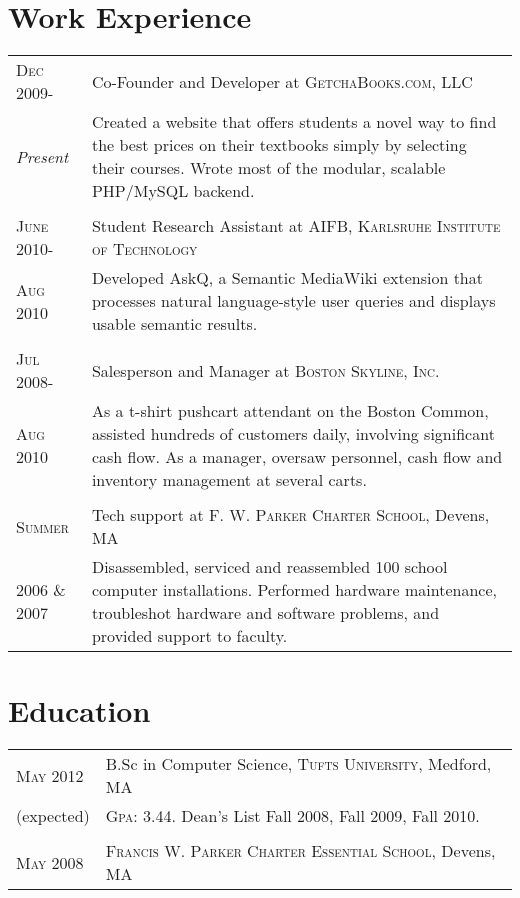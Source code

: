 \documentclass[letterpaper,10pt]{article}
\begin{document}
\section{Work Experience}
\begin{tabular}{p{5em}p{12cm}}
 \textsc{Dec 2009-} & Co-Founder and Developer at \textsc{GetchaBooks.com, LLC} \\\emph{Present}&\small{Created a website that offers students a novel way to find the best prices on their textbooks simply by selecting their courses.  Wrote most of the modular, scalable PHP/MySQL backend.} \\\multicolumn{2}{c}{} \\
\textsc{June 2010-} & Student Research Assistant at \textsc{AIFB, Karlsruhe Institute of Technology} \\ \textsc{Aug 2010} &\small{Developed AskQ, a Semantic MediaWiki extension that processes natural language-style user queries and displays usable semantic results.} \\\multicolumn{2}{c}{} \\
 \textsc{Jul 2008-} & Salesperson and Manager at \textsc{Boston Skyline, Inc.} \\\textsc{Aug 2010}&\small{As a t-shirt pushcart attendant on the Boston Common, assisted hundreds of customers daily, involving significant cash flow.  As a manager, oversaw personnel, cash flow and inventory management at several carts.}\\\multicolumn{2}{c}{} \\
\textsc{Summer} & Tech support at \textsc{F. W. Parker Charter School}, Devens, MA \\\textsc{2006 \& 2007}&\small{Disassembled, serviced and reassembled 100 school computer installations.  Performed hardware maintenance, troubleshot hardware and software problems, and provided support to faculty.}
\end{tabular}

\section{Education}
\begin{tabular}{p{5em}l}
\textsc{May} 2012 & B.Sc in Computer Science, \textsc{Tufts University}, Medford, MA\\
(expected) & \textsc{Gpa}: 3.44. Dean's List Fall 2008, Fall 2009, Fall 2010. \\\\
\textsc{May} 2008 & \textsc{Francis W. Parker Charter Essential School}, Devens, MA
\end{tabular}
\end{document}
